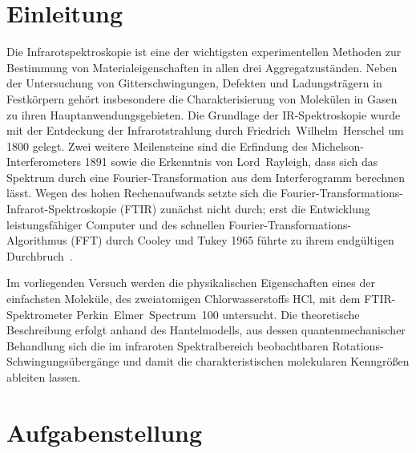 \documentclass[11pt,a4paper]{article}
\begin{document}
\tableofcontents
\newpage

\section{Einleitung}

Die Infrarotspektroskopie ist eine der wichtigsten experimentellen Methoden zur
Bestimmung von Materialeigenschaften in allen drei Aggregatzuständen. Neben der
Untersuchung von Gitterschwingungen, Defekten und Ladungsträgern in Festkörpern
gehört insbesondere die Charakterisierung von Molekülen in Gasen zu ihren
Hauptanwendungsgebieten. Die Grundlage der IR-Spektroskopie wurde mit der
Entdeckung der Infrarotstrahlung durch Friedrich~Wilhelm~Herschel um 1800 gelegt.
Zwei weitere Meilensteine sind die Erfindung des Michelson-Interferometers 1891
sowie die Erkenntnis von Lord~Rayleigh, dass sich das Spektrum durch eine
Fourier-Transformation aus dem Interferogramm berechnen lässt. Wegen des hohen
Rechenaufwands setzte sich die Fourier-Transformations-Infrarot-Spektroskopie
(FTIR) zunächst nicht durch; erst die Entwicklung leistungsfähiger Computer und
des schnellen Fourier-Transformations-Algorithmus (FFT) durch Cooley und Tukey
1965 führte zu ihrem endgültigen Durchbruch~\cite{FTIRhist}.

Im vorliegenden Versuch werden die physikalischen Eigenschaften eines der
einfachsten Moleküle, des zweiatomigen Chlorwasserstoffs HCl, mit dem
FTIR-Spektrometer Perkin~Elmer~Spectrum~100 untersucht. Die theoretische
Beschreibung erfolgt anhand des Hantelmodells, aus dessen quantenmechanischer
Behandlung sich die im infraroten Spektralbereich beobachtbaren
Rotations-Schwingungsübergänge und damit die charakteristischen molekularen
Kenngrößen ableiten lassen.

\section{Aufgabenstellung}
\label{sec:aufgaben}
\end{document}
